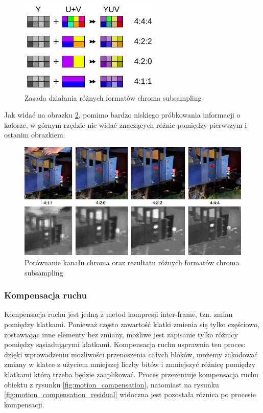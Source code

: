 \begin{figure}[H]
    \centering
    \includegraphics[width=0.6\textwidth]{img/rozdzial2/chroma_subsampling_ratios}
    \caption{Zasada działania różnych formatów chroma subsampling}
    \label{fig:chroma_subsampling_ratios}
\end{figure}

Jak widać na obrazku \ref{fig:chroma_subsampling_comparison}, pomimo bardzo niskiego próbkowania
informacji o kolorze, w górnym rzędzie nie widać znaczących różnic pomiędzy pierwszym i ostanim
obrazkiem.

\begin{figure}[H]
    \centering
    \includegraphics[width=\textwidth]{img/rozdzial2/chroma_subsampling_examples}
    \caption{Porównanie kanału chroma oraz rezultatu różnych formatów chroma subsampling}
    \label{fig:chroma_subsampling_comparison}
\end{figure}

\subsubsection{Kompensacja ruchu}

Kompensacja ruchu jest jedną z metod kompresji inter-frame, tzn. zmian pomiędzy klatkami. Ponieważ
często zawartość klatki zmienia się tylko częściowo, zostawiając inne elementy bez zmiany, możliwe
jest zapisanie tylko różnicy pomiędzy sąsiadującymi klatkami. Kompensacja ruchu usprawnia ten
proces: dzięki wprowadzeniu możliwości przenoszenia całych bloków, możemy zakodować zmiany w klatce
z użyciem mniejszej liczby bitów i zmniejszyć różnicę pomiędzy klatkami którą trzeba będzie
zaaplikować. Proces przezentuje kompensacja ruchu obiektu z rysunku \ref{fig:motion_compensation},
natomiast na rysunku \ref{fig:motion_compensation_residual} widoczna jest pozostała różnica po
procesie kompensacji.

